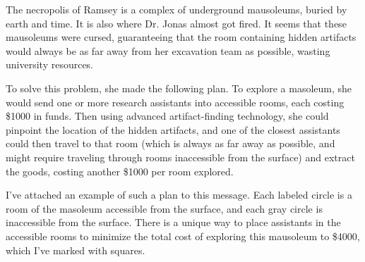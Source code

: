 The necropolis of Ramsey is a complex of underground mausoleums, buried by earth and time.
It is also where Dr. Jonas almost got fired. It seems that these mausoleums were cursed,
guaranteeing that the room containing hidden artifacts would always be as far away from her
excavation team as possible, wasting university resources.

To solve this problem, she made the following plan. To explore a masoleum, she would
send one or more research assistants into accessible rooms, each costing \$1000 in funds.
Then using advanced artifact-finding technology, she could pinpoint the location of the
hidden artifacts, and one of the closest assistants could then travel to that room 
(which is always as far away as possible, and might require traveling
through rooms inaccessible from the surface) and
extract the goods, costing another \$1000 per room explored.

I've attached an example of such a plan to this message. Each labeled circle
is a room of the masoleum accessible from the surface, and each gray circle
is inaccessible from the surface. There is a unique way to place assistants 
in the accessible rooms to minimize the total
cost of exploring this mausoleum to \$4000, which I've marked with squares.
 
